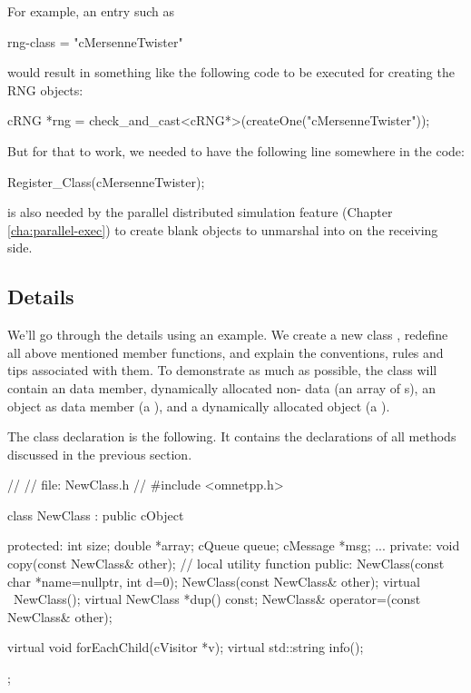 For example, an  entry such as

\begin{inifile}
rng-class = "cMersenneTwister"
\end{inifile}

would result in something like the following code to be executed
for creating the RNG objects:

\begin{cpp}
cRNG *rng = check_and_cast<cRNG*>(createOne("cMersenneTwister"));
\end{cpp}

But for that to work, we needed to have the following line somewhere in the code:

\begin{cpp}
Register_Class(cMersenneTwister);
\end{cpp}

 is also needed by the parallel distributed simulation feature
(Chapter \ref{cha:parallel-exec}) to create blank objects to unmarshal into
on the receiving side.


\subsection{Details}
\label{sec:sim-lib:subclassing-cobject-details}

We'll go through the details using an example. We create a new
class , redefine all above mentioned 
member functions, and explain the conventions, rules and tips
associated with them.
To demonstrate as much as possible, the class will contain
an  data member, dynamically allocated non- data
(an array of s),
an {\opp} object as data member (a ), and
a dynamically allocated {\opp} object (a ).

The class declaration is the following. It contains the declarations
of all methods discussed in the previous section.

\begin{cpp}
//
// file: NewClass.h
//
#include <omnetpp.h>

class NewClass : public cObject
{
  protected:
    int size;
    double *array;
    cQueue queue;
    cMessage *msg;
    ...
  private:
    void copy(const NewClass& other); // local utility function
  public:
    NewClass(const char *name=nullptr, int d=0);
    NewClass(const NewClass& other);
    virtual ~NewClass();
    virtual NewClass *dup() const;
    NewClass& operator=(const NewClass& other);

    virtual void forEachChild(cVisitor *v);
    virtual std::string info();
};
\end{cpp}

